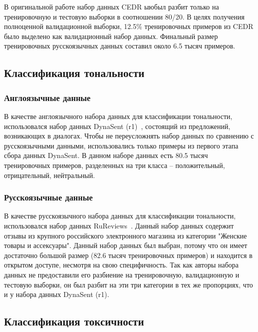 В оригинальной работе набор данных CEDR ыюбыл разбит только на тренировочную и тестовую выборки в соотношении 80/20. В целях получения полноценной валидационной выборки, 12.5\% тренировочных примеров из CEDR было выделено как валидационный набор данных. Финальный размер тренировочных русскоязычных данных составил около 6.5 тысяч примеров.


\subsection{Классификация тональности}

\subsubsection{Англоязычные данные} 
В качестве англоязычного набора данных для классификации тональности, использовался набор данных {DynaSent} (r1)~\cite{sentiment}, состоящий из предложений, возникающих в диалогах. Чтобы не переусложнять набор данных по сравнению с русскоязычными данными, использовались только примеры из первого этапа сбора данных DynaSent. В данном наборе данных есть 80.5 тысяч тренировочных примеров, разделенных на три класса -- положительный, отрицательный, нейтральный.

\subsubsection{Русскоязычные данные} 
В качестве русскоязычного набора данных для классификации тональности, использовался набор данных {RuReviews}~\cite{ru_sentiment}. Данный набор данных содержит отзывы из крупного российского электронного магазина из категории "Женские товары и ассексуары". Данный набор данных был выбран, потому что он имеет достаточно большой размер (82.6 тысяч тренировочных примеров) и находится в открытом доступе, несмотря на свою специфичность. Так как авторы набора данных не предоставили его разбиение на тренировочную, валидационную и тестовую выборки, он был разбит на эти три категории в тех же пропорциях, что и у набора данных
 {DynaSent} (r1).

\subsection{Классификация токсичности}
